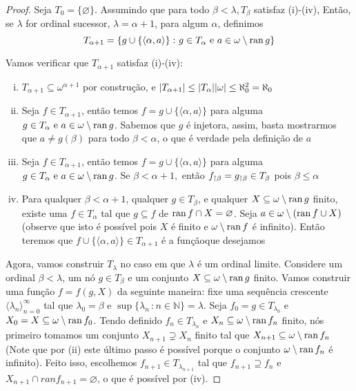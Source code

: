 \documentclass[a4paper]{article}
\begin{document}
\begin{proof}
    
    Seja \(T_0=\{\varnothing\}\). Assumindo que para todo \(\beta<\lambda,
    T_\beta\) satisfaz (i)-(iv), Então, se \(\lambda\) for ordinal sucessor,
    \(\lambda=\alpha+1\), para algum \(\alpha\), definimos
    \[T_{\alpha+1}=\{g\cup\{\langle \alpha, a\rangle\}\,\colon g\in
    T_\alpha \text{ e } a\in \omega\setminus\operatorname{ran} g\}\]
    
    Vamos verificar que \(T_{\alpha+1}\) satisfaz (i)-(iv):
    \begin{enumerate}[(i)]
    \item \(T_{\alpha+1}\subseteq\omega^{\alpha+1}\) por construção, e
      \(\vert T_{\alpha+1} \vert\leq\vert T_\alpha \vert\vert \omega \vert \le \aleph_0^2=\aleph_0\)
      \item Seja \(f\in T_{\alpha+1}\), então temos
        \(f=g\cup\{\langle\alpha,a\rangle\}\) 
        para alguma \(g\in T_\alpha \text{ e } a\in \omega\setminus\operatorname{ran} g\). Sabemos
        que \(g\) é injetora, assim, basta mostrarmos que \(a\neq g(\beta)\)
        para todo \(\beta<\alpha\), o que é verdade pela definição de \(a\)
      \item Seja \(f\in T_{\alpha+1}\), então temos
        \(f=g\cup\{\langle\alpha,a\rangle\}\) para
        alguma \(g\in T_\alpha \text{ e } a\in \omega\setminus\operatorname{ran} g\). Se
        \(\beta<\alpha+1,\) então \(f_{\upharpoonright \beta}=g_{\upharpoonright \beta}\in T_\beta\)
        pois \(\beta\leq\alpha\)
      \item Para qualquer \(\beta < \alpha+1\), qualquer \(g \in T_{\beta}\), e
    qualquer \(X \subseteq \omega\setminus \operatorname{ran} g\) finito, existe uma \(f \in
    T_{\alpha}\) tal que \(g \subseteq f\) de \(\operatorname{ran} f \cap X = \varnothing\).
    Seja \(a\in\omega\setminus(\operatorname{ran} f\cup X)\) (observe que isto
    é possível pois \(X\) é finito e \(\omega\setminus\operatorname{ran} f\) é infinito).
    Então teremos  que \(f\cup\{\langle\alpha,a\rangle\}\in T_{\alpha+1}\) é a
    funçãoque  desejamos
    \end{enumerate}
      
   Agora, vamos construir \(T_{\lambda}\) no caso em que \(\lambda\) é um ordinal
   limite. Considere um ordinal \(\beta< \lambda\), um nó \(g \in T_{\beta}\) e
   um conjunto \(X \subseteq \omega\setminus \operatorname{ran} g\) finito. Vamos construir uma
   função \(f = f(g, X)\) da seguinte maneira: fixe uma sequência
   crescente \(\langle \lambda_n \rangle_{n=0}^{\infty}\) tal que \(\lambda_0  =\beta\)
   e \(\sup\{\lambda_n\,\colon n \in \mathbb{N}\} = \lambda\). Seja
   \(f_0 = g \in T_{\lambda_0}\) e \(X_0 = X \subseteq \omega\setminus \operatorname{ran} f_0\). Tendo
   definido \(f_n \in T_{\lambda_n}\) e \(X_n\subseteq \omega\setminus \operatorname{ran} f_n\)
   finito, nós primeiro tomamos um conjunto \(X_{n+1} \supsetneq X_n\) finito tal
   que \(X_{n+1} \subseteq \omega\setminus \operatorname{ran} f_n\) (Note que por (ii) este último passo é
   possível porque o conjunto \(\omega\setminus\operatorname{ran} f_n\) é infinito).
   Feito isso, escolhemos \(f_{n+1} \in T_{\lambda_{n+1}}\) tal que \(f_{n+1}
   \supseteq f_n\) e  \(X_{n+1} \cap ranf_{n+1} = \varnothing\), o que é possível
   por (iv).
   

\end{proof}
\end{document}
